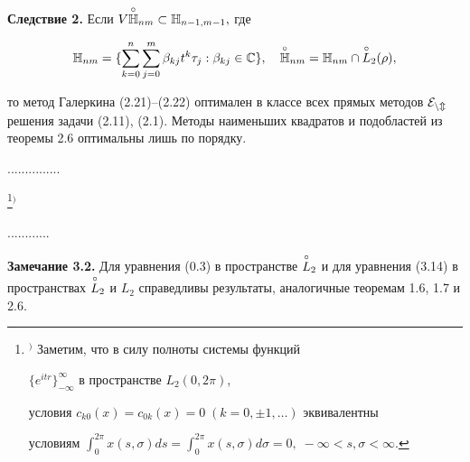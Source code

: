 {\bf Следствие 2. } Если $V \overset{\circ}{\Bbb H}{}_{nm}\subset \Bbb H_{n-1,m-1},$ где


$$


\bH_{nm} = \{\suml_{k=0}^n\suml_{j=0}^m \beta_{kj} t^k \tau_j: \beta_{kj}\in \bC\},\quad \cH_{nm} = \bH_{nm} \cap \cL(\rho),


$$


то метод Галеркина (2.21)--(2.22) оптимален в классе всех прямых методов $\cal E_{nm}$ решения задачи (2.11), (2.1). Методы наименьших квадратов и подобластей из теоремы 2.6 оптимальны лишь по порядку.





...............





\footnote[1]{$^)$ Заметим, что в силу полноты системы функций


$\{e^{itr}\}^\infty_{-\infty}$ в пространстве $L_2(0,2\pi)$,


условия $c_{k0}(x) = c_{0k}(x) = 0\; (k=0,\pm 1,\dots)$ эквивалентны


условиям $\int_{0}^{2\pi}x(s,\sigma)ds =


\int_0^{2\pi}x(s,\sigma)d\sigma = 0,\; -\infty< s,\sigma<\infty$.}$^)$





............





{\bf Замечание 3.2. } Для уравнения (0.3) в пространстве $\overset{\circ}{L}{}_2$ и для уравнения (3.14) в пространствах $\overset{\circ}{L}{}_2$ и $L_2$ справедливы результаты, аналогичные теоремам 1.6, 1.7 и 2.6.




















